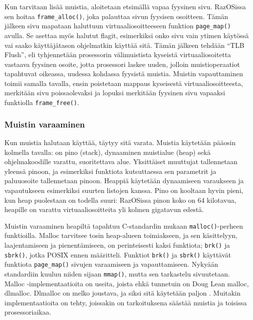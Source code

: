 \par

Kun tarvitaan lisää muistia, aloitetaan etsimällä vapaa fyysinen sivu. RazOSissa sen hoitaa \texttt{frame\_alloc()}, joka palauttaa sivun fyysisen osoitteen. Tämän jälkeen sivu mapataan haluttuun virtuaaliosoitteeseen funktion \texttt{page\_map()} avulla. Se asettaa myös halutut flagit, esimerkiksi onko sivu vain ytimen käytössä vai saako käyttäjätason ohjelmatkin käyttää sitä. Tämän jälkeen tehdään ``TLB Flush'', eli tyhjennetään prosessorin välimuistista kyseistä virtuaaliosoitetta vastaava fyysinen osoite, jotta prosessori laskee uuden, jolloin muistioperaatiot tapahtuvat oikeassa, uudessa kohdassa fyysistä muistia. Muistin vapauttaminen toimii samalla tavalla, ensin poistetaan mappaus kyseisestä virtuaaliosoitteesta, merkitään sivu poissaolevaksi ja lopuksi merkitään fyysinen sivu vapaaksi funktiolla \texttt{frame\_free()}.

\subsubsection{Muistin varaaminen}

Kun muistia halutaan käyttää, täytyy sitä varata. Muistia käytetään pääosin kolmella tavalla: on pino (stack), dynaaminen muistialue (heap) sekä ohjelmakoodille varattu, suoritettava alue. Yksittäiset muuttujat tallennetaan yleensä pinoon, ja esimerkiksi funktiota kutsuttaessa sen parametrit ja paluuosoite tallennetaan pinoon. Heappiä käytetään dynaamiseen varaukseen ja vapautukseen esimerkiksi suurten listojen kanssa. Pino on kooltaan hyvin pieni, kun heap puolestaan on todella suuri: RazOSissa pinon koko on 64 kilotavua, heapille on varattu virtuaaliosoitteita yli kolmen gigatavun edestä.

\par

Muistin varaaminen heapiltä tapahtuu C-standardin mukaan \texttt{malloc()}-perheen funktioilla. Malloc tarvitsee tosin heap-alueen toimiakseen, ja sen käsittelyyn, laajentamiseen ja pienentämiseen, on perinteisesti kaksi funktiota; \texttt{brk()} ja \texttt{sbrk()}, jotka POSIX ennen määritteli. Funktiot \texttt{brk()} ja \texttt{sbrk()} käyttävät funktiota \texttt{page\_map()} sivujen varaamiseen ja vapauttamiseen. Nykyään standardiin kuuluu niiden sijaan \texttt{mmap()}, mutta sen tarkastelu sivuutetaan. Malloc -implementaatioita on useita, joista ehkä tunnetuin on Doug Lean malloc, dlmalloc. Dlmalloc on melko joustava, ja siksi sitä käytetään paljon \parencite{dlmalloc}. Muitakin implementaatioita on tehty, joissakin on tarkoituksena säästää muistia ja toisissa prosessoriaikaa.

